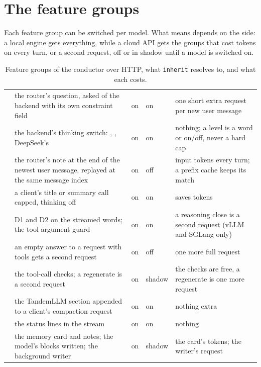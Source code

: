 \section{The feature groups}

Each feature group can be switched per model. What  means depends on the side: a local engine gets everything, while a cloud API gets the groups that cost tokens on every turn, or a second request, off or in shadow until a model is switched on.

\begin{table}[htbp]
\centering\small
\caption[Feature groups of the conductor over HTTP]{Feature groups of the conductor over HTTP, what \texttt{inherit} resolves to, and what each costs.}\label{tab:feature-groups}
\begin{tabularx}{\linewidth}{@{}L{.13\linewidth}YL{.07\linewidth}L{.07\linewidth}L{.22\linewidth}@{}}
\toprule
{} &  &  &  &  \\
\midrule
{} & the router's question, asked of the backend with its own constraint field & on & on & one short extra request per new user message \\
 & the backend's thinking switch: , , DeepSeek's  & on & on & nothing; a level is a word or on/off, never a hard cap \\
 & the router's note at the end of the newest user message, replayed at the same message index & on & off & input tokens every turn; a prefix cache keeps its match \\
 & a client's title or summary call capped, thinking off & on & on & saves tokens \\
 & D1 and D2 on the streamed words; the tool-argument guard & on & on & a reasoning close is a second request (vLLM and SGLang only) \\
 & an empty answer to a request with tools gets a second request & on & off & one more full request \\
 & the tool-call checks; a regenerate is a second request & on & shadow & the checks are free, a regenerate is one more request \\
 & the TandemLLM section appended to a client's compaction request & on & on & nothing extra \\
 & the status lines in the stream & on & on & nothing \\
 & the memory card and notes; the model's blocks written; the background writer & on & shadow & the card's tokens; the writer's request \\
\bottomrule
\end{tabularx}
\end{table}

